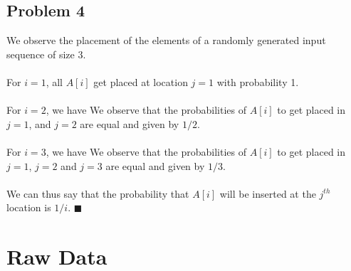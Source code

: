 \documentclass{article}
\begin{document}
\subsection{Problem 4}
We observe the placement of the elements of a randomly generated input sequence of size 3.\\\\
For $i=1$, all $A[i]$ get placed at location $j=1$ with probability 1.\\\\
For $i=2$, we have
We observe that the probabilities of $A[i]$ to get placed in $j=1$, and $j=2$ are equal and given by $1/2$.\\\\
For $i=3$, we have
We observe that the probabilities of $A[i]$ to get placed in $j=1$, $j=2$ and $j=3$ are equal and given by $1/3$.\\\\
We can thus say that the probability that $A[i]$ will be inserted at the $j^{th}$ location is $1/i$. $\blacksquare$
\section{Raw Data}
\label{sec:data}
\end{document}

